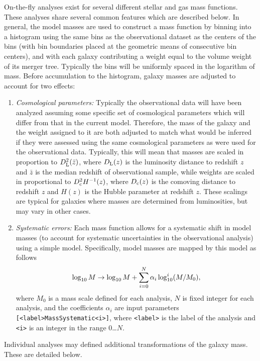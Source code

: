 On-the-fly analyses exist for several different stellar and gas mass functions. These analyses share several common features which are described below. In general, the model masses are used to construct a mass function by binning into a histogram using the same bins as the observational dataset as the centers of the bins (with bin boundaries placed at the geometric means of consecutive bin centers), and with each galaxy contributing a weight equal to the volume weight of its merger tree. Typically the bins will be uniformly spaced in the logarithm of mass. Before accumulation to the histogram, galaxy masses are adjusted to account for two effects:
\begin{enumerate}
\item \emph{Cosmological parameters:} Typically the observational data will have been analyzed assuming some specific set of cosmological parameters which will differ from that in the current model. Therefore, the mass of the galaxy and the weight assigned to it are both adjusted to match what would be inferred if they were assessed using the same cosmological parameters as were used for the observational data. Typically, this will mean that masses are scaled in proportion to $D_{\rm L}^2(\bar{z})$, where $D_{\rm L}(z)$ is the luminosity distance to redshift $z$ and $\bar{z}$ is the median redshift of observational sample, while weights are scaled in proportional to $D_{\rm c}^2 H^{-1}(z)$, where $D_{\rm c}(z)$ is the comoving distance to redshift $z$ and $H(z)$ is the Hubble parameter at redshift $z$. These scalings are typical for galaxies where masses are determined from luminosities, but may vary in other cases.
\item \emph{Systematic errors:} Each mass function allows for a systematic shift in model masses (to account for systematic uncertainties in the observational analysis) using a simple model. Specifically, model masses are mapped by this model as follows
\begin{equation}
\log_{\rm 10} M \rightarrow \log_{10} M + \sum_{i=0}^N \alpha_i \log^i_{10}(M/M_0),
\end{equation}
where $M_0$ is a mass scale defined for each analysis, $N$ is fixed integer for each analysis, and the coefficients $\alpha_i$ are input parameters {\tt [\textless label\textgreater MassSystematic\textless i\textgreater]}, where {\tt \textless label\textgreater} is the label of the analysis and {\tt \textless i\textgreater} is an integer in the range 0\ldots$N$.
\end{enumerate}
Individual analyses may defined additional transformations of the galaxy mass. These are detailed below.

